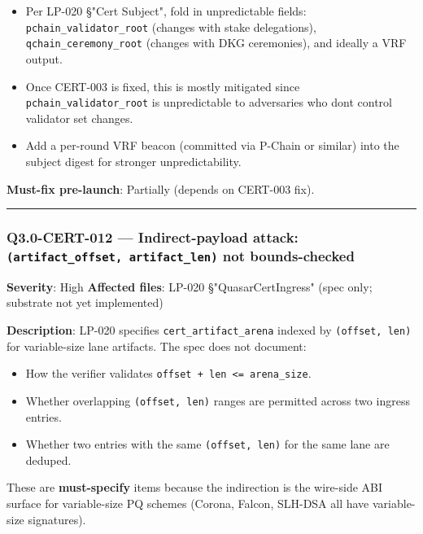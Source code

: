 \documentclass[
]{article}
\providecommand{\tightlist}{%
  \setlength{\itemsep}{0pt}\setlength{\parskip}{0pt}}
\begin{document}
\begin{itemize}
\tightlist
\item
  Per LP-020 §"Cert Subject", fold in unpredictable fields:
  \texttt{pchain\_validator\_root} (changes with stake delegations),
  \texttt{qchain\_ceremony\_root} (changes with DKG ceremonies), and
  ideally a VRF output.
\item
  Once CERT-003 is fixed, this is mostly mitigated since
  \texttt{pchain\_validator\_root} is unpredictable to adversaries who
  don\textquotesingle t control validator set changes.
\item
  Add a per-round VRF beacon (committed via P-Chain or similar) into the
  subject digest for stronger unpredictability.
\end{itemize}

\textbf{Must-fix pre-launch}: Partially (depends on CERT-003 fix).

\begin{center}\rule{0.5\linewidth}{0.5pt}\end{center}

\subsubsection{\texorpdfstring{Q3.0-CERT-012 --- Indirect-payload
attack: \texttt{(artifact\_offset,\ artifact\_len)} not
bounds-checked}{Q3.0-CERT-012 --- Indirect-payload attack: (artifact\_offset, artifact\_len) not bounds-checked}}\label{q30-cert-012--indirect-payload-attack-artifact_offset-artifact_len-not-bounds-checked}

\textbf{Severity}: High \textbf{Affected files}: LP-020
§"QuasarCertIngress" (spec only; substrate not yet implemented)

\textbf{Description}: LP-020 specifies \texttt{cert\_artifact\_arena}
indexed by \texttt{(offset,\ len)} for variable-size lane artifacts. The
spec does not document:

\begin{itemize}
\tightlist
\item
  How the verifier validates
  \texttt{offset\ +\ len\ \textless{}=\ arena\_size}.
\item
  Whether overlapping \texttt{(offset,\ len)} ranges are permitted
  across two ingress entries.
\item
  Whether two entries with the same \texttt{(offset,\ len)} for the same
  lane are deduped.
\end{itemize}

These are \textbf{must-specify} items because the indirection is the
wire-side ABI surface for variable-size PQ schemes (Corona, Falcon,
SLH-DSA all have variable-size signatures).
\end{document}
